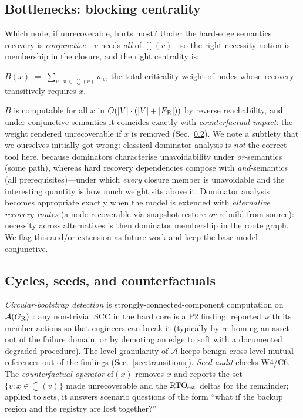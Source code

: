 \subsection{Bottlenecks: blocking centrality}
\label{sec:blocking}

Which node, if unrecoverable, hurts most? Under the hard-edge semantics recovery is \emph{conjunctive}---$v$ needs \emph{all} of $\closure(v)$---so the right necessity notion is membership in the closure, and the right centrality is:

\begin{definition}
\label{def:blocking}
$B(x) \;=\; \sum_{v \,:\, x \,\in\, \closure(v)} w_v$, the total criticality weight of nodes whose recovery transitively requires $x$.
\end{definition}

$B$ is computable for all $x$ in $O(|V| \cdot (|V| + |E_{\mathrm{R}}|))$ by reverse reachability, and under conjunctive semantics it coincides exactly with \emph{counterfactual impact}: the weight rendered unrecoverable if $x$ is removed (Sec.~\ref{sec:counterfactual}). We note a subtlety that we ourselves initially got wrong: classical dominator analysis \citep{lengauer1979dominators} is \emph{not} the correct tool here, because dominators characterise unavoidability under \emph{or}-semantics (some path), whereas hard recovery dependencies compose with \emph{and}-semantics (all prerequisites)---under which \emph{every} closure member is unavoidable and the interesting quantity is how much weight sits above it. Dominator analysis becomes appropriate exactly when the model is extended with \emph{alternative recovery routes} (a node recoverable via snapshot restore \emph{or} rebuild-from-source): necessity across alternatives is then dominator membership in the route graph. We flag this and/or extension as future work and keep the base model conjunctive.

\subsection{Cycles, seeds, and counterfactuals}
\label{sec:counterfactual}

\emph{Circular-bootstrap detection} is strongly-connected-component computation on $\mathcal{A}(G_{\mathrm{R}})$ \citep{tarjan1972dfs}: any non-trivial SCC in the hard core is a P2 finding, reported with its member actions so that engineers can break it (typically by re-homing an asset out of the failure domain, or by demoting an edge to soft with a documented degraded procedure). The level granularity of $\mathcal{A}$ keeps benign cross-level mutual references out of the findings (Sec.~\ref{sec:transitions}). \emph{Seed audit} checks W4/C6. The \emph{counterfactual operator} $\mathrm{cf}(x)$ removes $x$ and reports the set $\{v : x \in \closure(v)\}$ made unrecoverable and the $\mathrm{RTO}_{\mathrm{est}}$ deltas for the remainder; applied to sets, it answers scenario questions of the form ``what if the backup region and the registry are lost together?''

